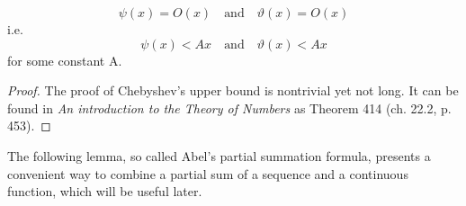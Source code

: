 \documentclass{article}
\begin{document}
\begin{lemma}
\label{lemma:cheb}
\begin{equation*}
    \psi(x) = O(x) \quad\text{and}\quad \vartheta(x)=O(x)
\end{equation*}
i.e.
\begin{equation*}
    \psi(x) < Ax \quad\text{and}\quad \vartheta(x) < Ax
\end{equation*}
for some constant A.
\begin{proof}
The proof of Chebyshev's upper bound is nontrivial yet not long. It can be found in \textit{An introduction to the Theory of Numbers} \cite{HardyWright} as Theorem 414 (ch. 22.2, p. 453).
\end{proof}
\end{lemma}

The following lemma, so called Abel's partial summation formula, presents a convenient way to combine a partial sum of a sequence and a continuous function, which will be useful later.
\end{document}
